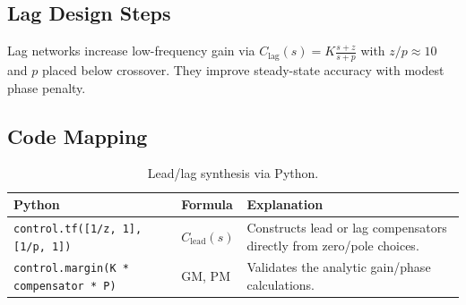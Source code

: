 \subsection{Lag Design Steps}
Lag networks increase low-frequency gain via $C_{\text{lag}}(s) = K \frac{s + z}{s + p}$ with $z/p \approx 10$ and $p$ placed below crossover. They improve steady-state accuracy with modest phase penalty.

\subsection{Code Mapping}
\begin{table}[h]
    \centering
    \small
    \renewcommand{\arraystretch}{1.2}
    \begin{tabularx}{\linewidth}{|>{\raggedright\arraybackslash}p{4cm}|X|X|}
        \hline
        \textbf{Python} & \textbf{Formula} & \textbf{Explanation} \\
        \hline
        \texttt{control.tf([1/z, 1], [1/p, 1])} & $C_{\text{lead}}(s)$ & Constructs lead or lag compensators directly from zero/pole choices. \\
        \hline
        \texttt{control.margin(K * compensator * P)} & GM, PM & Validates the analytic gain/phase calculations. \\
        \hline
    \end{tabularx}
    \caption{Lead/lag synthesis via Python.}
\end{table}

